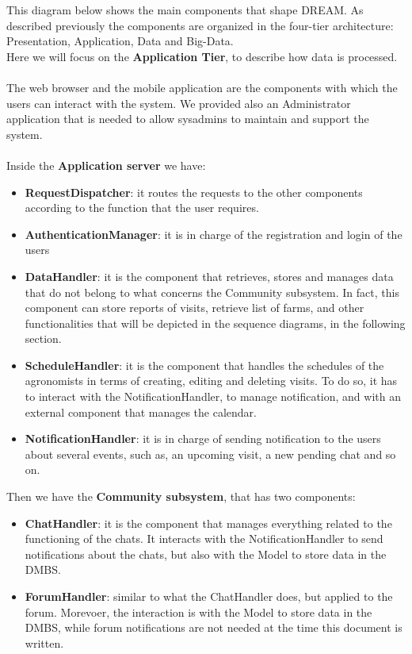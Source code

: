 \documentclass[10pt]{report}
\begin{document}
This diagram below shows the main components that shape DREAM. As described previously the components are organized in the four-tier architecture: Presentation, Application, Data and Big-Data.\\ Here we will focus on the \textbf{Application Tier}, to describe how data is processed.\\\\
The web browser and the mobile application are the components with which the users can interact with the system. We provided also an Administrator application that is needed to allow sysadmins to maintain and support the system.\\\\
Inside the \textbf{Application server} we have:
\begin{itemize}
    \item \textbf{RequestDispatcher}: it routes the requests to the other components according to the function that the user requires.
    \item \textbf{AuthenticationManager}: it is in charge of the registration and login of the users
    \item \textbf{DataHandler}: it is the component that retrieves, stores and manages data that do not belong to what concerns the Community subsystem. In fact, this component can store reports of visits, retrieve list of farms, and other functionalities that will be depicted in the sequence diagrams, in the following section.
    \item \textbf{ScheduleHandler}: it is the component that handles the schedules of the agronomists in terms of creating, editing and deleting visits. To do so, it has to interact with the NotificationHandler, to manage notification, and with an external component that manages the calendar.
    \item \textbf{NotificationHandler}: it is in charge of sending notification to the users about several events, such as, an upcoming visit, a new pending chat and so on.
\end{itemize}
Then we have the \textbf{Community subsystem}, that has two components:
\begin{itemize}
    \item \textbf{ChatHandler}: it is the component that manages everything related to the functioning of the chats. It interacts with the NotificationHandler to send notifications about the chats, but also with the Model to store data in the DMBS.
    \item \textbf{ForumHandler}: similar to what the ChatHandler does, but applied to the forum. Morevoer, the interaction is with the Model to store data in the DMBS, while forum notifications are not needed at the time this document is written.
\end{itemize}
\end{document}
